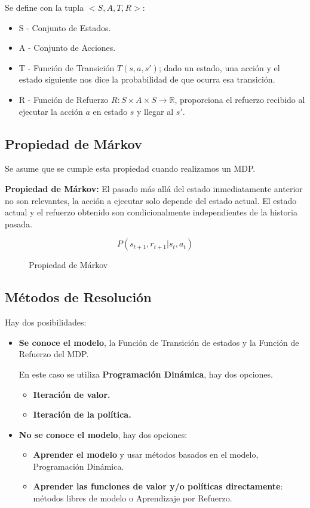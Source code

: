 \documentclass[12pt, twoside, openright]{report} %
\begin{document}
Se define con la tupla $<S, A, T, R>$:
\begin{itemize}
	\item S - Conjunto de Estados.
	\item A - Conjunto de Acciones.
	\item T - Función de Transición $T(s, a, s')$; dado un estado, una acción y el estado siguiente nos dice la probabilidad de que ocurra esa transición.
	\item R - Función de Refuerzo $R: S \times A \times S \rightarrow \mathbb{R}$, proporciona el refuerzo recibido al ejecutar la acción $a$ en estado $s$ y llegar al $s'$.
\end{itemize}

\subsection{Propiedad de Márkov}
Se asume que se cumple esta propiedad cuando realizamos un MDP.

\textbf{Propiedad de Márkov:} El pasado más allá del estado inmediatamente anterior no son relevantes, la acción a ejecutar solo depende del estado actual. El estado actual y el refuerzo obtenido son condicionalmente independientes de la historia pasada.
\begin{figure}[H]
	$$P(s_{t+1}, r_{t+1}| s_t,a_t)$$
	\captionsetup{justification=centering}
	\caption{Propiedad de Márkov}
\end{figure}

\subsection{Métodos de Resolución}
Hay dos posibilidades:
\begin{itemize}
	\item \textbf{Se conoce el modelo}, la Función de Transición de estados y la Función de Refuerzo del MDP.

	      En este caso se utiliza \textbf{Programación Dinámica}, hay dos opciones.
	      \begin{itemize}
		      \item \textbf{Iteración de valor.}
		      \item \textbf{Iteración de la política.}
	      \end{itemize}
	\item \textbf{No se conoce el modelo}, hay dos opciones:
	      \begin{itemize}
		      \item \textbf{Aprender el modelo} y usar métodos basados en el modelo, Programación Dinámica.
		      \item \textbf{Aprender las funciones de valor y/o políticas directamente}: métodos libres de modelo o Aprendizaje por Refuerzo.
	      \end{itemize}
\end{itemize}
\end{document}
